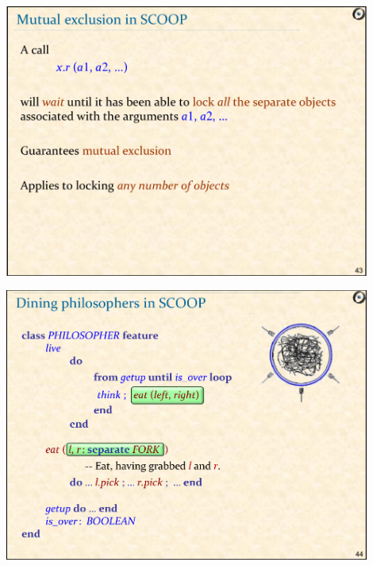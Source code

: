 \documentclass[xetex,mathserif,serif]{beamer}
\begin{document}
	\begin{frame}
		\begin{center}
			\includegraphics[width=0.9\textwidth]{meyer6.png}
		\end{center}
	\end{frame}

	\begin{frame}
		\begin{center}
			\includegraphics[width=0.9\textwidth]{meyer7.png}
		\end{center}
	\end{frame}
\end{document}
